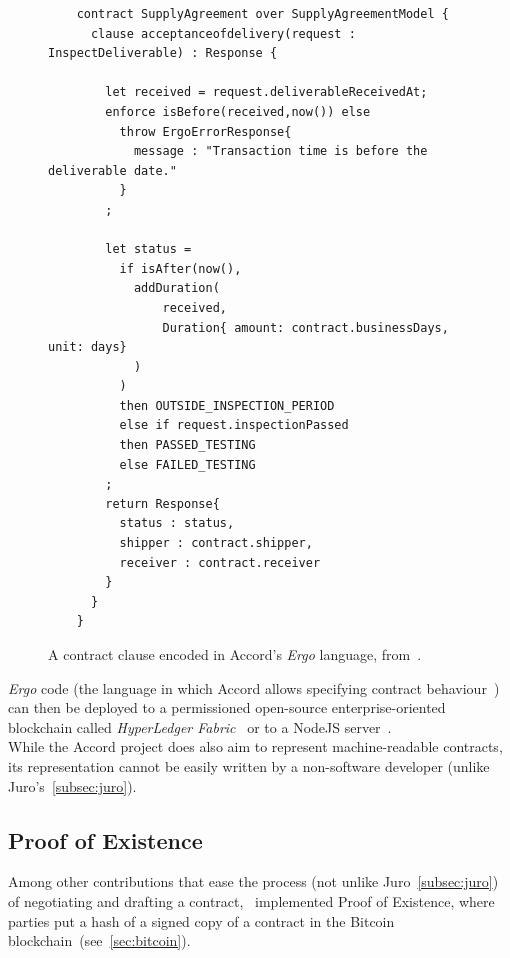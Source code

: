 \begin{figure}[th]
    \centering
    \small
    \begin{verbatim}
    contract SupplyAgreement over SupplyAgreementModel {
      clause acceptanceofdelivery(request : InspectDeliverable) : Response {

        let received = request.deliverableReceivedAt;
        enforce isBefore(received,now()) else
          throw ErgoErrorResponse{
            message : "Transaction time is before the deliverable date."
          }
        ;

        let status =
          if isAfter(now(),
            addDuration(
                received,
                Duration{ amount: contract.businessDays, unit: days}
            )
          )
          then OUTSIDE_INSPECTION_PERIOD
          else if request.inspectionPassed
          then PASSED_TESTING
          else FAILED_TESTING
        ;
        return Response{
          status : status,
          shipper : contract.shipper,
          receiver : contract.receiver
        }
      }
    }
    \end{verbatim}
    \caption[Accord contract clause as code]{A contract clause encoded in Accord's \textit{Ergo} language,
        from~\cite{accordAfterSignatureCode}.}
    \label{fig:accord-post-signature-code}
\end{figure}

\textit{Ergo} code (the language in which Accord allows specifying contract behaviour~\cite{accordErgo}) can then be
deployed to a permissioned open-source enterprise-oriented blockchain called \textit{HyperLedger
Fabric}~\cite{hyperledgerFabric_repo, accordFabricDeployDocs} or to a NodeJS server~\cite{accordNodeJSDeployDocs}.\\

While the Accord project does also aim to represent machine-readable contracts, its representation
cannot be easily written by a non-software developer (unlike Juro's~\ref{subsec:juro}).

\subsection{Proof of Existence}\label{subsec:proof-of-existence}

Among other contributions that ease the process (not unlike Juro~\ref{subsec:juro}) of negotiating
and drafting a contract,~\cite[Express Agreement]{expressAgreement} implemented Proof of Existence,
where parties put a hash of a signed copy of a contract in the Bitcoin blockchain~(see~\ref{sec:bitcoin}).

